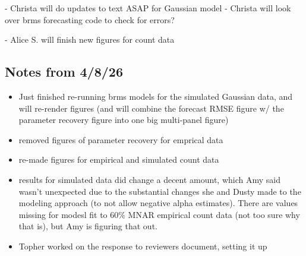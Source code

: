 \documentclass{article}
\begin{document}
- Christa will do updates to text ASAP for Gaussian model 
- Christa will look over brms forecasting code to check for errors? 

- Alice S. will finish new figures for count data

\subsection{Notes from 4/8/26}
\begin{itemize}
   
\item{Just finished re-running brms models for the simulated Gaussian data, and will re-render figures (and will combine the forecast RMSE figure w/ the parameter recovery figure into one big multi-panel figure)}
\item{removed figures of parameter recovery for emprical data }
\item{re-made figures for empirical and simulated count data}
\item{results for simulated data did change a decent amount, which Amy said wasn't unexpected due to the substantial changes she and Dusty made to the modeling approach (to not allow negative alpha estimates). There are values missing for modesl fit to 60\% MNAR empirical count data (not too sure why that is), but Amy is figuring that out.}
\item{ Topher worked on the response to reviewers document, setting it up}
\end{itemize}
\end{document}
